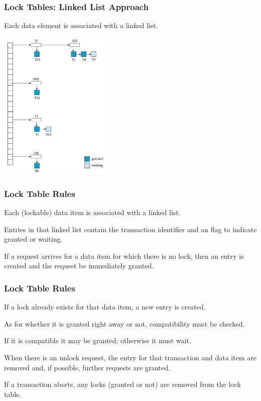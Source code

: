 \begin{frame}
\frametitle{Lock Tables: Linked List Approach}

Each data element is associated with a linked list. 



\begin{center}
	\includegraphics[width=0.4\textwidth]{images/lock-table}
\end{center}


\end{frame}

\begin{frame}
\frametitle{Lock Table Rules}

Each (lockable) data item is associated with a linked list. 

Entries in that linked list contain the transaction identifier and an flag to indicate granted or waiting.

If a request arrives for a data item for which there is no lock, then an entry is created and the request be immediately granted. 

\end{frame}

\begin{frame}
\frametitle{Lock Table Rules}
If a lock already exists for that data item, a new entry is created. 

As for whether it is granted right away or not, compatibility must be checked. 

If it is compatible it may be granted; otherwise it must wait. 

When there is an unlock request, the entry for that transaction and data item are removed and, if possible, further requests are granted. 

If a transaction aborts, any locks (granted or not) are removed from the lock table.

\end{frame}

